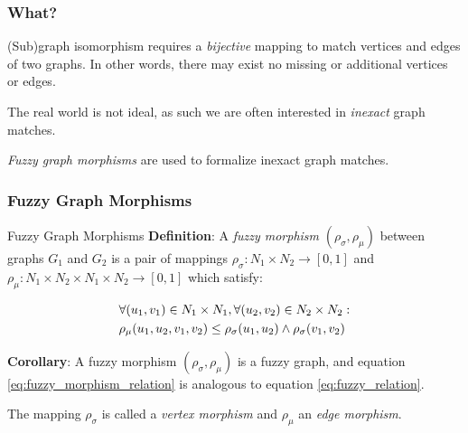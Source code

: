 



\begin{frame}
	\frametitle{What?}

	(Sub)graph isomorphism requires a \textit{bijective} mapping to match vertices and edges of two graphs. In other words, there may exist no missing or additional vertices or edges.

	\vspace*{2em}

	The real world is not ideal, as such we are often interested in \textit{inexact} graph matches.

	\vspace*{2em}

	\textit{Fuzzy graph morphisms} are used to formalize inexact graph matches.
\end{frame}

\begin{frame}
	\frametitle{Fuzzy Graph Morphisms}

	\begin{block}{Fuzzy Graph Morphisms}
		\textbf{Definition}: A \textit{fuzzy morphism} $(\rho_{\sigma}, \rho_{\mu})$ between graphs $G_1$ and $G_2$ is a pair of mappings $\rho_{\sigma}: N_1 \times N_2 \rightarrow [0, 1]$ and $\rho_{\mu}: N_1 \times N_2 \times N_1 \times N_2 \rightarrow [0, 1]$ which satisfy:

		\begin{equation}
			\begin{aligned}
				& \forall (u_1, v_1) \in N_1 \times N_1, \forall (u_2, v_2) \in N_2 \times N_2: \\
				& \rho_{\mu}(u_1, u_2, v_1, v_2) \le \rho_{\sigma}(u_1, u_2) \land \rho_{\sigma}(v_1, v_2)
			\end{aligned}
			\label{eq:fuzzy_morphism_relation}
		\end{equation}

		\textbf{Corollary}: A fuzzy morphism $(\rho_{\sigma}, \rho_{\mu})$ is a fuzzy graph, and equation \ref{eq:fuzzy_morphism_relation} is analogous to equation \ref{eq:fuzzy_relation}.

		\vspace*{2em}

		The mapping $\rho_{\sigma}$ is called a \textit{vertex morphism} and $\rho_{\mu}$ an \textit{edge morphism}.
	\end{block}
\end{frame}

